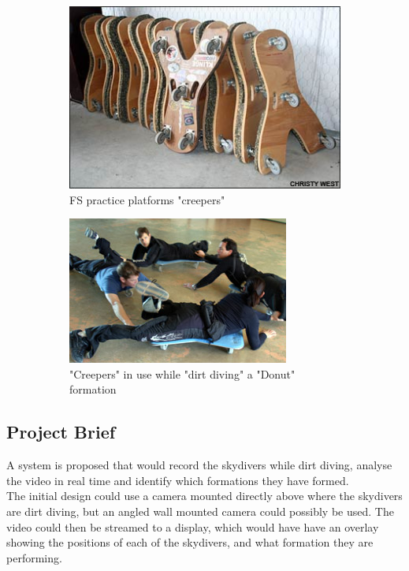 \documentclass[adpaper,12pt]{book}
\begin{document}
\begin{figure}[H]
	\centering
	\begin{subfigure}{.5\textwidth}
		\centering
		\includegraphics[width=0.9\linewidth]{creepers.jpg}
		\caption{FS practice platforms "creepers"}
		\label{fig:creepers}
	\end{subfigure}%
	\begin{subfigure}{.5\textwidth}
		\centering
		\includegraphics[width=0.9\linewidth]{creepers_use.jpg}
		\caption{"Creepers" in use while "dirt diving" a "Donut" formation}
		\label{fig:creepers_use}
	\end{subfigure}
	\caption{}
\end{figure}
%
	\subsection{Project Brief}
A system is proposed that would record the skydivers while dirt diving, analyse the video in real time and identify which formations they have formed.\\
The initial design could use a camera mounted directly above where the skydivers are dirt diving, but an angled wall mounted camera could possibly be used.
The video could then be streamed to a display, which would have have an overlay showing the positions of each of the skydivers, and what formation they are performing.
	
\end{document}
